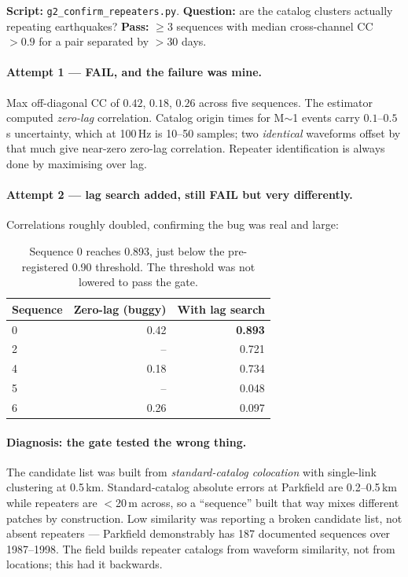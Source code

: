 \documentclass[11pt]{article}
\begin{document}
\textbf{Script:} \texttt{g2\_confirm\_repeaters.py}. \textbf{Question:} are the
catalog clusters actually repeating earthquakes? \textbf{Pass:} $\ge 3$ sequences
with median cross-channel CC $>0.9$ for a pair separated by $>30$ days.

\paragraph{Attempt 1 --- FAIL, and the failure was mine.} Max off-diagonal CC of
$0.42$, $0.18$, $0.26$ across five sequences. The estimator computed
\emph{zero-lag} correlation. Catalog origin times for M$\sim$1 events carry
$0.1$--$0.5$\,s uncertainty, which at 100\,Hz is 10--50 samples; two
\emph{identical} waveforms offset by that much give near-zero zero-lag
correlation. Repeater identification is always done by maximising over lag.

\paragraph{Attempt 2 --- lag search added, still FAIL but very differently.}
Correlations roughly doubled, confirming the bug was real and large:

\begin{table}[H]
\centering
\begin{tabular}{lrr}
\toprule
Sequence & Zero-lag (buggy) & With lag search \\
\midrule
0 & 0.42 & \textbf{0.893} \\
2 & --   & 0.721 \\
4 & 0.18 & 0.734 \\
5 & --   & 0.048 \\
6 & 0.26 & 0.097 \\
\bottomrule
\end{tabular}
\caption{Sequence 0 reaches 0.893, just below the pre-registered 0.90 threshold.
The threshold was not lowered to pass the gate.}
\end{table}

\paragraph{Diagnosis: the gate tested the wrong thing.} The candidate list was
built from \emph{standard-catalog colocation} with single-link clustering at
0.5\,km. Standard-catalog absolute errors at Parkfield are 0.2--0.5\,km while
repeaters are $<$20\,m across, so a ``sequence'' built that way mixes different
patches by construction. Low similarity was reporting a broken candidate list,
not absent repeaters --- Parkfield demonstrably has 187 documented sequences over
1987--1998. The field builds repeater catalogs from waveform similarity, not from
locations; this had it backwards.
\end{document}
